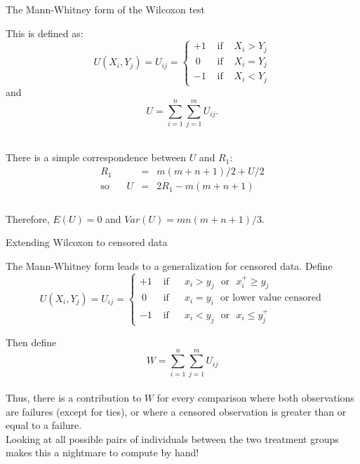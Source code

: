 \documentclass[envcountsect, 10pt, portrait, palatino]{beamer}
\begin{document}
\begin{frame}{The Mann-Whitney form of the Wilcoxon test}

This is defined as:\\[0.5ex]
\[U(X_i,Y_j)=U_{ij}=\left\{\begin{array}{ccc}
+1 & \mbox{ if } & X_i>Y_j\\
~0 & \mbox{ if } & X_i=Y_j\\
-1 & \mbox{ if } & X_i<Y_j
\end{array} \right.\]
and
\[U=\sum_{i=1}^n \sum_{j=1}^m U_{ij}.\]

~\\[2ex]
There is a simple correspondence between $U$ and $R_1$:
\begin{eqnarray*}
R_1 & = & m(m+n+1)/2+U/2\\[2ex]
\mbox{so}~~~~~~~~ U & = & 2 R_1 - m(m+n+1)\\[3ex]
\end{eqnarray*}
~\\[-2ex]
Therefore, $E(U) =  0$ and $Var(U) = mn(m+n+1)/3$.
\end{frame}

\begin{frame}{Extending Wilcoxon to censored data}

The Mann-Whitney form leads to a generalization
for censored data.  Define
\[U(X_i,Y_j)=U_{ij}=\left\{\begin{array}{ccl}
+1 & \mbox{ if } & ~~x_i>y_j \mbox{~~or~~} x_i^+\geq y_j\\
~0 & \mbox{ if } & ~~x_i=y_i \mbox{~~or lower value censored}\\
-1 & \mbox{ if } & ~~x_i<y_j \mbox{~~or~~} x_i \leq y_j^+
\end{array} \right. \]

Then define $$W=\sum_{i=1}^{n} \sum_{j=1}^{m} U_{ij}$$
\\[2ex]
Thus, there is a contribution to $W$ for every comparison
where both observations are failures (except for ties), or
where a censored observation is greater than or equal to a failure.
\\[2ex]
Looking at all possible pairs of individuals between the
two treatment groups makes this a nightmare to compute by
hand!
\end{frame}
\end{document}
